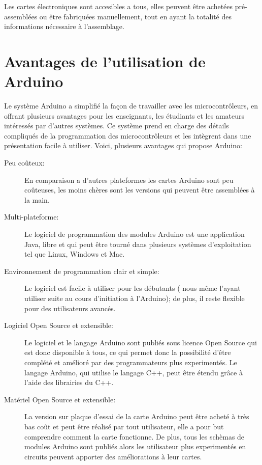 Les cartes électroniques sont accesibles a tous, elles peuvent être achetées pré-assemblées ou être fabriquées manuellement, tout en ayant la totalité des
informations nécessaire à l'assemblage.

\section{Avantages de l'utilisation de Arduino}

Le système Arduino a simplifié la façon de travailler avec les microcontrôleurs, en offrant plusieurs avantages pour les enseignants, les étudiants et 
les amateurs intéressés par d'autres systèmes. Ce système prend en charge des détails compliqués de la programmation des microcontrôleurs et les intègrent
dans une présentation facile à utiliser. Voici, plusieurs avantages qui propose Arduino:

\begin{description}
 \item[Peu coûteux:] En comparaison a d'autres plateformes les cartes Arduino sont peu coûteuses, les moins chères sont les versions qui peuvent être 
assemblées à la main.
 \item[Multi-plateforme:] Le logiciel de programmation des modules Arduino est une application Java, libre et qui peut être tourné dans plusieurs systèmes
d'exploitation tel que Linux, Windows et Mac.
 \item[Environnement de programmation clair et simple:] Le logiciel est facile à utiliser pour les débutants ( nous même l'ayant utiliser suite au cours
d'initiation à l'Arduino); de plus, il reste flexible pour des utilisateurs avancés.
 \item[Logiciel Open Source et extensible:] Le logiciel et le langage Arduino sont publiés sous licence Open Source qui est donc disponible à tous, ce qui 
permet donc la possibilité d'être complété et amélioré par des programmateurs plus experimentés. Le langage Arduino, qui utilise le langage C++, peut
être étendu grâce à l'aide des librairies du C++.
 \item[Matériel Open Source et extensible:] La version sur plaque d'essai de la carte Arduino peut être acheté à très bas coût et peut être réalisé par
tout utilisateur, elle a pour but comprendre comment la carte fonctionne. De plus, tous les schèmas de modules Arduino sont publiés alors les 
utilisateur plus experimentés en circuits peuvent apporter des améliorations à leur cartes.
\end{description}


